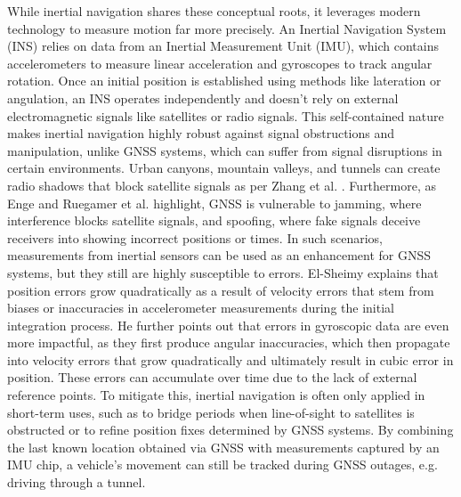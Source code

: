 While inertial navigation shares these conceptual roots, it leverages modern technology to measure motion far more precisely. 
An Inertial Navigation System (INS) relies on data from an Inertial Measurement Unit (IMU), which contains accelerometers to measure linear acceleration and gyroscopes to track angular rotation. 
Once an initial position is established using methods like lateration or angulation, an INS operates independently and doesn't rely on external electromagnetic signals like satellites or radio signals. 
This self-contained nature makes inertial navigation highly robust against signal obstructions and manipulation, unlike GNSS systems, which can suffer from signal disruptions in certain environments. 
Urban canyons, mountain valleys, and tunnels can create radio shadows that block satellite signals as per Zhang et al. \cite{zhang2021gnss}. 
Furthermore, as Enge \cite{enge1994global} and Ruegamer et al. \cite{ruegamer2015jamming} highlight, GNSS is vulnerable to jamming, where interference blocks satellite signals, and spoofing, where fake signals deceive receivers into showing incorrect positions or times.
In such scenarios, measurements from inertial sensors can be used as an enhancement for GNSS systems, but they still are highly susceptible to errors.
El-Sheimy \cite{sheimy2006ins} explains that position errors grow quadratically as a result of velocity errors that stem from biases or inaccuracies in accelerometer measurements during the initial integration process. 
He further points out that errors in gyroscopic data are even more impactful, as they first produce angular inaccuracies, which then propagate into velocity errors that grow quadratically and ultimately result in cubic error in position. 
These errors can accumulate over time due to the lack of external reference points. 
To mitigate this, inertial navigation is often only applied in short-term uses, such as to bridge periods when line-of-sight to satellites is obstructed or to refine position fixes determined by GNSS systems. 
By combining the last known location obtained via GNSS with measurements captured by an IMU chip, a vehicle's movement can still be tracked during GNSS outages, e.g. driving through a tunnel.

